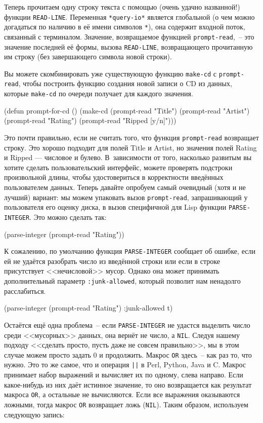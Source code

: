 Теперь прочитаем одну строку текста с помощью (очень удачно названной!) функции
\lstinline{READ-LINE}. Переменная \lstinline{*query-io*} является глобальной (о чем можно
догадаться по наличию в её имени символов \lstinline{*}), она содержит входной поток, связанный
с терминалом. Значение, возвращаемое функцией \lstinline{prompt-read},~-- это значение
последней её формы, вызова \lstinline{READ-LINE}, возвращающего прочитанную им строку (без
завершающего символа новой строки).

Вы можете скомбинировать уже существующую функцию \lstinline{make-cd} с \lstinline{prompt-read},
чтобы построить функцию создания новой записи о CD из данных, которые \lstinline{make-cd} по
очереди получает для каждого значения.

\begin{myverb}
(defun prompt-for-cd ()
 (make-cd
  (prompt-read "Title")
  (prompt-read "Artist")
  (prompt-read "Rating")
  (prompt-read "Ripped [y/n]")))
\end{myverb}

Это почти правильно, если не считать того, что функция \lstinline{prompt-read} возвращает
строку. Это хорошо подходит для полей Title и Artist, но значения полей Rating и Ripped
--- числовое и булево. В~зависимости от того, насколько развитым вы хотите сделать
пользовательский интерфейс, можете проверять подстроки произвольной длины, чтобы
удостовериться в корректности введённых пользователем данных. Теперь давайте опробуем
самый очевидный (хотя и не лучший) вариант: мы можем упаковать вызов \lstinline{prompt-read},
запрашивающий у пользователя его оценку диска, в вызов специфичной для Lisp функции
\lstinline{PARSE-INTEGER}. Это можно сделать так:

\begin{myverb}
(parse-integer (prompt-read "Rating"))
\end{myverb}

К сожалению, по умолчанию функция \lstinline{PARSE-INTEGER} сообщает об ошибке, если ей не
удаётся разобрать число из введённой строки или если в строке присутствует <<нечисловой>>
мусор. Однако она может принимать дополнительный параметр \lstinline{:junk-allowed}, который позволит
нам ненадолго расслабиться.

\begin{myverb}
(parse-integer (prompt-read "Rating") :junk-allowed t)
\end{myverb}

Остаётся ещё одна проблема~-- если \lstinline{PARSE-INTEGER} не удастся выделить число среди
<<мусорных>> данных, она вернёт не число, а \lstinline{NIL}. Следуя нашему подходу <<сделать
просто, пусть даже не совсем правильно>>, мы в этом случае можем просто задать 0 и
продолжить. Макрос \lstinline{OR} здесь~-- как раз то, что нужно. Это то же самое, что и
операция \lstinline{||} в Perl, Python, Java и C. Макрос принимает набор выражений и
вычисляет их по одному, слева направо. Если какое-нибудь из них даёт истинное значение, то
оно возвращается как результат макроса \lstinline{OR}, а остальные не вычисляются. Если
все выражения оказываются ложными, тогда макрос \lstinline{OR} возвращает ложь
(\lstinline{NIL}). Таким образом, используем следующую запись:

